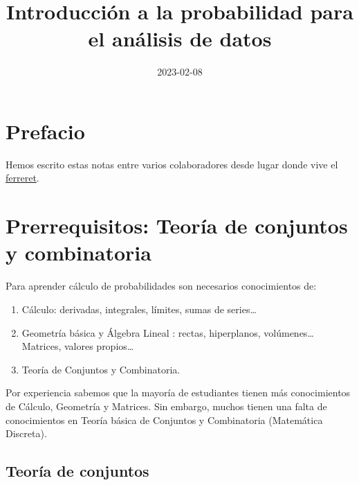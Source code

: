 \documentclass[
  letterpaper,
  DIV=11,
  numbers=noendperiod]{scrreprt}
\title{Introducción a la probabilidad para el análisis de datos}
\author{}
\date{2023-02-08}
\providecommand{\tightlist}{%
  \setlength{\itemsep}{0pt}\setlength{\parskip}{0pt}}\usepackage{longtable,booktabs,array}
\renewcommand*\contentsname{Tabla de contenidos}
\newcommand\contentsname{Tabla de contenidos}
\begin{document}
\maketitle
\renewcommand*\contentsname{Tabla de contenidos}
{
\hypersetup{linkcolor=}
\setcounter{tocdepth}{2}
\tableofcontents
}

\hypertarget{prefacio}{%
\chapter*{Prefacio}\label{prefacio}}


Hemos escrito estas notas entre varios colaboradores desde lugar donde
vive el
\href{https://es.wikipedia.org/wiki/Alytes_muletensis}{ferreret}.


\hypertarget{prerrequisitos-teoruxeda-de-conjuntos-y-combinatoria}{%
\chapter*{Prerrequisitos: Teoría de conjuntos y
combinatoria}\label{prerrequisitos-teoruxeda-de-conjuntos-y-combinatoria}}


Para aprender cálculo de probabilidades son necesarios conocimientos de:

\begin{enumerate}
\def\labelenumi{\arabic{enumi}.}
\tightlist
\item
  Cálculo: derivadas, integrales, límites, sumas de series\ldots{}
\item
  Geometría básica y Álgebra Lineal : rectas, hiperplanos,
  volúmenes\ldots{} Matrices, valores propios\ldots{}
\item
  Teoría de Conjuntos y Combinatoria.
\end{enumerate}

Por experiencia sabemos que la mayoría de estudiantes tienen más
conocimientos de Cálculo, Geometría y Matrices. Sin embargo, muchos
tienen una falta de conocimientos en Teoría básica de Conjuntos y
Combinatoria (Matemática Discreta).

\hypertarget{teoruxeda-de-conjuntos}{%
\section{Teoría de conjuntos}\label{teoruxeda-de-conjuntos}}
\end{document}
